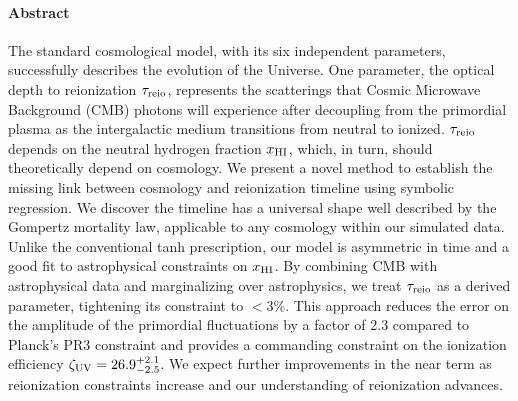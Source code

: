 \paragraph{\large Abstract}  %
The standard cosmological model, with its six independent parameters,
successfully describes the evolution of the Universe.
One parameter, the optical depth to reionization $\tau_{\mathrm{reio}}$,
represents the scatterings that Cosmic Microwave Background (CMB)
photons will experience after decoupling from the primordial plasma as
the intergalactic medium transitions from neutral to ionized.
$\tau_{\mathrm{reio}}$ depends on the neutral hydrogen fraction $x_{\mathrm{HI}}$, which, in
turn, should theoretically depend on cosmology.
We present a novel method to establish the missing link between
cosmology and reionization timeline using symbolic regression.
We discover the timeline has a universal shape well described by the
Gompertz mortality law, applicable to any cosmology within our simulated
data.
Unlike the conventional tanh prescription, our model is asymmetric in time
and a good fit to astrophysical constraints on $x_{\mathrm{HI}}$.
By combining CMB with astrophysical data and marginalizing over
astrophysics, we treat $\tau_{\mathrm{reio}}$ as a derived parameter, tightening
its constraint to $<3\%$.
This approach reduces the error on the amplitude of the primordial
fluctuations by a factor of 2.3 compared to Planck's PR3 constraint and
provides a commanding constraint on the ionization efficiency $\zeta_\mathrm{UV} =
26.9^{+2.1}_{-2.5}$.
We expect further improvements in the near term as reionization 
constraints increase and our understanding of reionization advances. 

